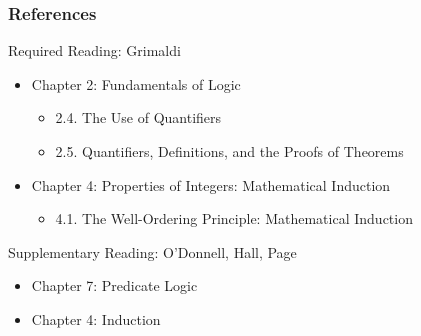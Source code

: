 \documentclass[dvipsnames]{beamer}
\begin{document}
\begin{frame}
  \frametitle{References}

  \begin{block}{Required Reading: Grimaldi}
    \begin{itemize}
      \item Chapter 2: Fundamentals of Logic
      \begin{itemize}
        \item 2.4. \alert{The Use of Quantifiers}
        \item 2.5. \alert{Quantifiers, Definitions, and the Proofs of Theorems}
      \end{itemize}
      \item Chapter 4: Properties of Integers: Mathematical Induction
      \begin{itemize}
        \item 4.1. \alert{The Well-Ordering Principle: Mathematical Induction}
      \end{itemize}
    \end{itemize}
  \end{block}

  \begin{block}{Supplementary Reading: O'Donnell, Hall, Page}
    \begin{itemize}
      \item Chapter 7: Predicate Logic
      \item Chapter 4: Induction
    \end{itemize}
  \end{block}
\end{frame}
\end{document}
